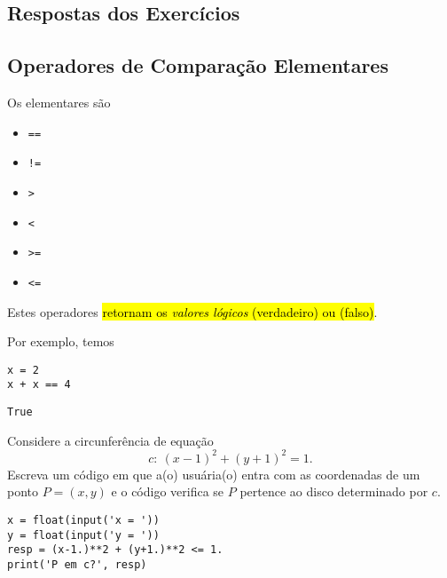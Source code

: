 \ifisbook 
\subsection*{Respostas dos Exercícios}
\shipoutAnswer
\fi

\subsection{Operadores de Comparação Elementares}

Os  elementares são
\begin{itemize}
\item[]\texttt{==} 
\item[]\texttt{!=} 
\item[]\texttt{>} 
\item[]\texttt{<} 
\item[]\texttt{>=} 
\item[]\texttt{<=} 
\end{itemize}
Estes operadores \hl{retornam os \emph{valores lógicos} {\PYTHONTrue} (verdadeiro) ou {\PYTHONFalse} (falso)}.

Por exemplo, temos

\begin{lstlisting}
x = 2
x + x == 4
\end{lstlisting}

\begin{verbatim}
True
\end{verbatim}

\begin{exer}
  Considere a circunferência de equação
  \begin{equation}
    c: ~(x - 1)^2 + (y + 1)^2 = 1.
  \end{equation}
  Escreva um código em que a(o) usuária(o) entra com as coordenadas de um ponto $P = (x, y)$ e o código verifica se $P$ pertence ao disco determinado por $c$.
\end{exer}
\begin{resp}
  
\begin{lstlisting}
x = float(input('x = '))
y = float(input('y = '))
resp = (x-1.)**2 + (y+1.)**2 <= 1.
print('P em c?', resp)
\end{lstlisting}

\end{resp}

